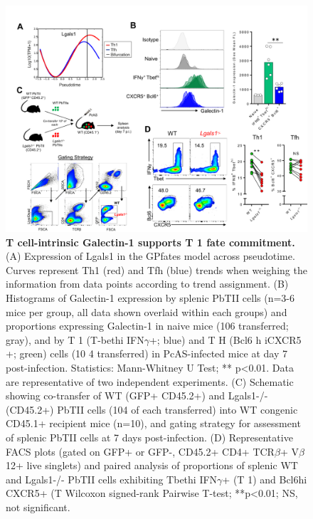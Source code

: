 \begin{figure}
    \centering
    \includegraphics[width=\textwidth]{"Fig S14 rev3"}
    \caption[T cell-intrinsic Galectin-1 supports T 1 fate commitment]{\textbf{T cell-intrinsic Galectin-1 supports T 1 fate commitment.} (A) Expression of Lgals1 in the GPfates model across pseudotime. Curves represent Th1 (red) and Tfh (blue) trends when weighing the information from data points according to trend assignment. (B) Histograms of Galectin-1 expression by splenic PbTII cells (n=3-6 mice per group, all data shown overlaid within each groups) and proportions expressing Galectin-1 in naive mice (106 transferred; gray), and by T 1 (T-bethi IFN\( \gamma \)+; blue) and T H (Bcl6 h iCXCR5 +; green) cells (10 4 transferred) in PcAS-infected mice at day 7 post-infection. Statistics: Mann-Whitney U Test; ** p<0.01. Data are representative of two independent experiments. (C) Schematic showing co-transfer of WT (GFP+ CD45.2+) and Lgals1-/- (CD45.2+) PbTII cells (104 of each transferred) into WT congenic CD45.1+ recipient mice (n=10), and gating strategy for assessment of splenic PbTII cells at 7 days post-infection. (D) Representative FACS plots (gated on GFP+ or GFP-, CD45.2+ CD4+ TCR\( \beta \)+ V\( \beta \)12+ live singlets) and paired analysis of proportions of splenic WT and Lgals1-/- PbTII cells exhibiting Tbethi IFN\( \gamma \)+ (T 1) and Bcl6hi CXCR5+ (T Wilcoxon signed-rank Pairwise T-test; **p<0.01; NS, not significant.}
    \label{fig:ms14}
\end{figure}

